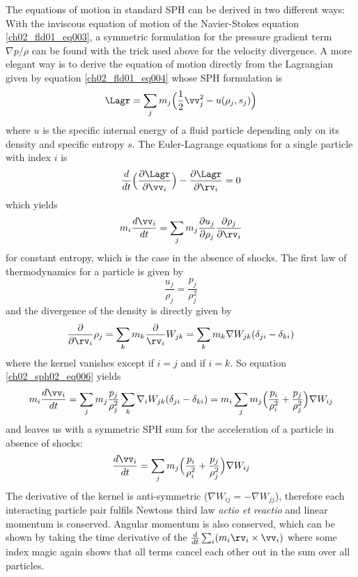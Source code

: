 The equations of motion in standard SPH can be derived in two different ways: With the inviscous equation of motion of the Navier-Stokes equation \ref{ch02_fld01_eq003}, a symmetric formulation for the pressure gradient term $\nabla p / \rho$ can be found with the trick used above for the velocity divergence. 
A more elegant way is to derive the equation of motion directly from the Lagrangian given by equation \ref{ch02_fld01_eq004} whose SPH formulation is
\begin{equation}
\label{ch02_sph02_eq004}
\Lagr = \sum_{j} m_j \Big( \frac{1}{2} \vv_j^2 - u(\rho_j, s_j) \Big) 
\end{equation}
where $u$ is the specific internal energy of a fluid particle depending only on its density and specific entropy $s$. The Euler-Lagrange equations for a single particle with index $i$ is
\begin{equation}
\label{ch02_sph02_eq005}
\frac{d}{dt} \Big( \frac{\partial \Lagr}{\partial \vv_i} \Big) - \frac{\partial \Lagr}{\partial \rv_i} = 0
\end{equation}
which yields 
\begin{equation}
\label{ch02_sph02_eq006}
m_i \frac{d \vv_i }{dt} = \sum_{j} m_j \frac{\partial u_j}{\partial \rho_j} \frac{\partial \rho_j}{\partial \rv_i}
\end{equation}
for constant entropy, which is the case in the absence of shocks. The first law of thermodynamics for a particle is given by
\begin{equation}
\label{ch02_sph02_eq007}
\frac{u_j}{\rho_j} = \frac{p_j}{\rho_j^2}
\end{equation}
and the divergence of the density is directly given by
\begin{equation}
\label{ch02_sph02_eq008}
\frac{\partial }{\partial \rv_i} \rho_j
= \sum_{k} m_k \frac{\partial}{\rv_i} W_{jk} 
= \sum_{k} m_k \nabla W_{jk} ( \delta_{ji} - \delta_{ki})
\end{equation}
where the kernel vanishes except if $i = j$ and if $i = k$. So equation \ref{ch02_sph02_eq006} yields
\begin{equation}
\label{ch02_sph02_eq009}
m_i \frac{d \vv_i }{dt} = \sum_{j} m_j \frac{p_j}{\rho_j^2} \sum_{k} \nabla_i W_{jk} ( \delta_{ji} - \delta_{ki})\\
 = m_i \sum_{j} m_j \Big( \frac{p_i}{\rho_i^2} + \frac{p_j}{\rho_j^2} \Big) \nabla W_{ij}
\end{equation}
and leaves us with a symmetric SPH sum for the acceleration of a particle in absence of shocks:
\begin{equation}
\label{ch02_sph02_eq010}
\frac{d \vv_i }{dt} = \sum_{j} m_j \Big( \frac{p_i}{\rho_i^2} + \frac{p_j}{\rho_j^2} \Big) \nabla W_{ij}
\end{equation}
The derivative of the kernel is anti-symmetric ($\nabla W_{ij} = - \nabla W_{jj}$), therefore each interacting particle pair fulfils Newtons third law \emph{actio et reactio} and linear momentum is conserved. Angular momentum is also conserved, which can be shown by taking the time derivative of the $\frac{d}{dt} \sum_i (m_i \rv_i \times \vv_i)$ where some index magic \citep{Price:2004p2613} again shows that all terms cancel each other out in the sum over all particles.


